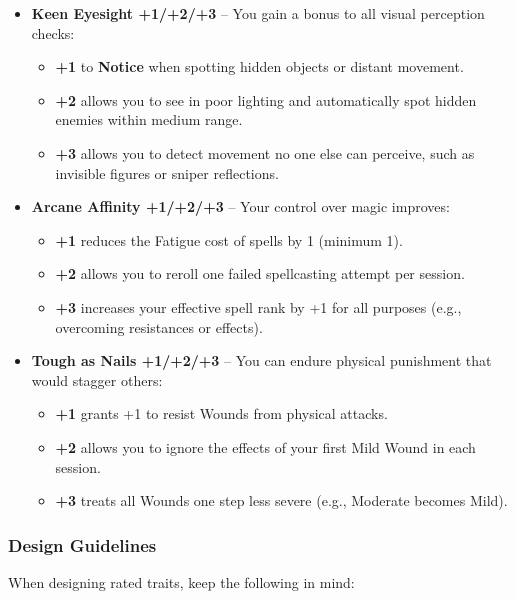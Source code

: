 \begin{itemize}
    \item \textbf{Keen Eyesight +1/+2/+3} – You gain a bonus to all visual perception checks:
    \begin{itemize}
        \item \textbf{+1} to \textbf{Notice} when spotting hidden objects or distant movement.
        \item \textbf{+2} allows you to see in poor lighting and automatically spot hidden enemies within medium range.
        \item \textbf{+3} allows you to detect movement no one else can perceive, such as invisible figures or sniper reflections.
    \end{itemize}

    \item \textbf{Arcane Affinity +1/+2/+3} – Your control over magic improves:
    \begin{itemize}
        \item \textbf{+1} reduces the Fatigue cost of spells by 1 (minimum 1).
        \item \textbf{+2} allows you to reroll one failed spellcasting attempt per session.
        \item \textbf{+3} increases your effective spell rank by +1 for all purposes (e.g., overcoming resistances or effects).
    \end{itemize}

    \item \textbf{Tough as Nails +1/+2/+3} – You can endure physical punishment that would stagger others:
    \begin{itemize}
        \item \textbf{+1} grants +1 to resist Wounds from physical attacks.
        \item \textbf{+2} allows you to ignore the effects of your first Mild Wound in each session.
        \item \textbf{+3} treats all Wounds one step less severe (e.g., Moderate becomes Mild).
    \end{itemize}
\end{itemize}

\subsubsection*{Design Guidelines}
When designing rated traits, keep the following in mind:

